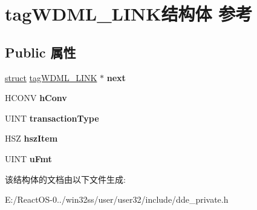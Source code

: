 \hypertarget{structtag_w_d_m_l___l_i_n_k}{}\section{tag\+W\+D\+M\+L\+\_\+\+L\+I\+N\+K结构体 参考}
\label{structtag_w_d_m_l___l_i_n_k}
\subsection*{Public 属性}
\begin{DoxyCompactItemize}
\item 
\mbox{\label{structtag_w_d_m_l___l_i_n_k_a1fa2e1fb00fe9dbcde5990ac2e815faa}} 
\hyperlink{interfacestruct}{struct} \hyperlink{structtag_w_d_m_l___l_i_n_k}{tag\+W\+D\+M\+L\+\_\+\+L\+I\+NK} $\ast$ {\bfseries next}
\item 
\mbox{\label{structtag_w_d_m_l___l_i_n_k_a904a399261061a9f9459ad723a5b49b0}} 
H\+C\+O\+NV {\bfseries h\+Conv}
\item 
\mbox{\label{structtag_w_d_m_l___l_i_n_k_a158ed8dd6b3ed89915c30d8d3c0c2315}} 
U\+I\+NT {\bfseries transaction\+Type}
\item 
\mbox{\label{structtag_w_d_m_l___l_i_n_k_a266c0b199803f80420edf1f18c65157c}} 
H\+SZ {\bfseries hsz\+Item}
\item 
\mbox{\label{structtag_w_d_m_l___l_i_n_k_abeed65031e3f2a6d7722099016d60049}} 
U\+I\+NT {\bfseries u\+Fmt}
\end{DoxyCompactItemize}


该结构体的文档由以下文件生成\+:\begin{DoxyCompactItemize}
\item 
E\+:/\+React\+O\+S-\/0../win32ss/user/user32/include/dde\+\_\+private.\+h\end{DoxyCompactItemize}
